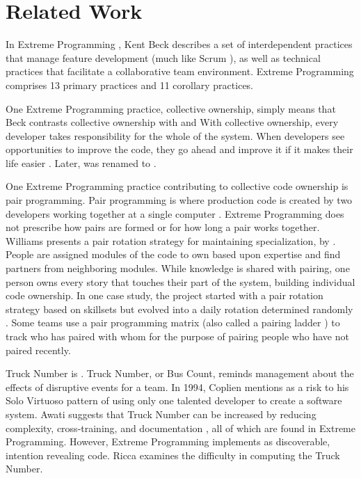 \section{Related Work}
\label{RelatedWork}
In Extreme Programming \cite{BeckExtremeProgramming2004}, Kent Beck describes a set of interdependent practices that manage feature development (much like Scrum \cite{SchwaberScrum}), as well as technical practices that facilitate a collaborative team environment. Extreme Programming comprises 13 primary practices and 11 corollary practices. 

One Extreme Programming practice, collective ownership, simply means that  Beck contrasts collective ownership with  and  With collective ownership, every developer takes responsibility for the whole of the system. When developers see opportunities to improve the code, they go ahead and improve it if it makes their life easier \cite{BeckExtremeProgramming1999}. Later,  was renamed to  \cite{BeckExtremeProgramming2004}. 

One Extreme Programming practice contributing to collective code ownership is pair programming. Pair programming is where production code is created by two developers working together at a single computer \cite{BeckExtremeProgramming2004}. Extreme Programming does not prescribe how pairs are formed or for how long a pair works together. Williams presents a pair rotation strategy for maintaining specialization, by   \cite{Williams2002}. People are assigned modules of the code to own based upon expertise and find partners from neighboring modules. While knowledge is shared with pairing, one person owns every story that touches their part of the system, building individual code ownership. In one case study, the project started with a pair rotation strategy based on skillsets but evolved into a daily rotation determined randomly \cite{Vanhanen2007}. Some teams use a pair programming matrix \cite{AlaverdyanPairProgrammingMatrix} (also called a pairing ladder \cite{Davies2009AgileCoaching}) to track who has paired with whom for the purpose of pairing people who have not paired recently.

Truck Number is  \cite{WikiTruckNumber}. Truck Number, or Bus Count, reminds management about the effects of disruptive events for a team. In 1994, Coplien \cite{Coplien1994} mentions  as a risk to his Solo Virtuoso pattern of using only one talented developer to create a software system. Awati suggests that Truck Number can be increased by reducing complexity, cross-training, and documentation \cite{AwatiBusFactor}, all of which are found in Extreme Programming. However, Extreme Programming implements  as discoverable, intention revealing code. Ricca \cite{Ricca2011TruckFactor} examines the difficulty in computing the Truck Number. 

